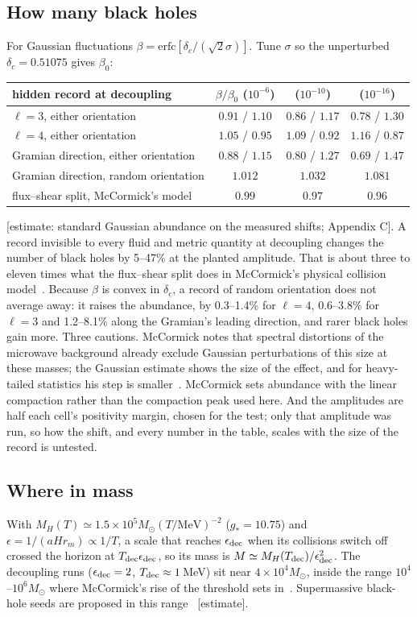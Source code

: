 \documentclass[11pt]{article}
\theoremstyle{definition}\newtheorem{hypothesis}{Hypothesis}\newtheorem{prediction}{Prediction}
\theoremstyle{remark}\newtheorem{remark}[theorem]{Remark}
\newcommand{\grade}[1]{\textsf{\small[#1]}}
\begin{document}
\subsection{How many black holes}
For Gaussian fluctuations $\beta=\mathrm{erfc}[\delta_c/(\sqrt2\sigma)]$. Tune $\sigma$ so the unperturbed $\delta_c=0.51075$ gives $\beta_0$:
\begin{center}\begin{tabular}{lccc}\toprule
hidden record at decoupling & $\beta/\beta_0$ ($10^{-6}$) & ($10^{-10}$) & ($10^{-16}$)\\\midrule
$\ell=3$, either orientation & $0.91$ / $1.10$ & $0.86$ / $1.17$ & $0.78$ / $1.30$\\
$\ell=4$, either orientation & $1.05$ / $0.95$ & $1.09$ / $0.92$ & $1.16$ / $0.87$\\
Gramian direction, either orientation & $0.88$ / $1.15$ & $0.80$ / $1.27$ & $0.69$ / $1.47$\\
Gramian direction, random orientation & $1.012$ & $1.032$ & $1.081$\\\midrule
flux--shear split, McCormick's model & $0.99$ & $0.97$ & $0.96$\\\bottomrule\end{tabular}\end{center}
\grade{estimate: standard Gaussian abundance on the measured shifts; Appendix C}. A record invisible to every fluid and metric quantity at decoupling changes the number of black holes by 5--47\% at the planted amplitude. That is about three to eleven times what the flux--shear split does in McCormick's physical collision model~\cite{NU10}. Because $\beta$ is convex in $\delta_c$, a record of random orientation does not average away: it raises the abundance, by 0.3--1.4\% for $\ell=4$, 0.6--3.8\% for $\ell=3$ and 1.2--8.1\% along the Gramian's leading direction, and rarer black holes gain more. Three cautions. McCormick notes that spectral distortions of the microwave background already exclude Gaussian perturbations of this size at these masses; the Gaussian estimate shows the size of the effect, and for heavy-tailed statistics his step is smaller~\cite{McC}. McCormick sets abundance with the linear compaction rather than the compaction peak used here. And the amplitudes are half each cell's positivity margin, chosen for the test; only that amplitude was run, so how the shift, and every number in the table, scales with the size of the record is untested.

\subsection{Where in mass}
With $M_H(T)\simeq1.5\times10^5M_\odot(T/\mathrm{MeV})^{-2}$ ($g_*=10.75$) and $\epsilon=1/(aHr_m)\propto1/T$, a scale that reaches $\epsilon_{\rm dec}$ when its collisions switch off crossed the horizon at $T_{\rm dec}\epsilon_{\rm dec}$, so its mass is $M\simeq M_H(T_{\rm dec})/\epsilon_{\rm dec}^2$. The decoupling runs ($\epsilon_{\rm dec}=2$, $T_{\rm dec}\approx1$\,MeV) sit near $4\times10^4M_\odot$, inside the range $10^4$--$10^6M_\odot$ where McCormick's rise of the threshold sets in~\cite{McC}. Supermassive black-hole seeds are proposed in this range~\cite{Dave} \grade{estimate}.
\end{document}
